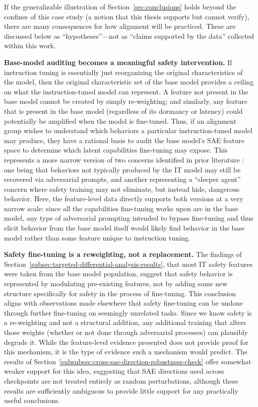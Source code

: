 If the generalizable illustration of Section~\ref{sec:conclusions} holds beyond the confines of this case study (a notion that this thesis supports but cannot verify), there are many consequences for how alignment will be practiced. These are discussed below as ``hypotheses''---not as ``claims supported by the data'' collected within this work.

\textbf{Base-model auditing becomes a meaningful safety intervention.} If instruction tuning is essentially just reorganizing the original characteristics of the model, then the original characteristic set of the base model provides a ceiling on what the instruction-tuned model can represent. A feature not present in the base model cannot be created by simply re-weighting; and similarly, any feature that is present in the base model (regardless of its dormancy or latency) could potentially be amplified when the model is fine-tuned. Thus, if an alignment group wishes to understand which behaviors a particular instruction-tuned model may produce, they have a rational basis to audit the base model's SAE feature space to determine which latent capabilities fine-tuning may expose. This represents a more narrow version of two concerns identified in prior literature \parencite{zou_universal_2023,hubinger_sleeper_2024}: one being that behaviors not typically produced by the IT model may still be recovered via adversarial prompts, and another representing a ``sleeper agent'' concern where safety training may not eliminate, but instead hide, dangerous behavior. Here, the feature-level data directly supports both versions at a very narrow scale: since all the capabilities fine-tuning works upon are in the base model, any type of adversarial prompting intended to bypass fine-tuning and thus elicit behavior from the base model itself would likely find behavior in the base model rather than some feature unique to instruction tuning.

\textbf{Safety fine-tuning is a reweighting, not a replacement.} The findings of Section~\ref{subsec:targeted-differential-analysis-results}, that most IT safety features were taken from the base model population, suggest that safety behavior is represented by modulating pre-existing features, not by adding some new structure specifically for safety in the process of fine-tuning. This conclusion aligns with observations made elsewhere \parencite{jain2024makesbreakssafetyfinetuning} that safety fine-tuning can be undone through further fine-tuning on seemingly unrelated tasks. Since we know safety is a re-weighting and not a structural addition, any additional training that alters those weights (whether or not done through adversarial processes) can plausibly degrade it. While the feature-level evidence presented does not provide proof for this mechanism, it is the type of evidence such a mechanism would predict. The results of Section~\ref{subsubsec:cross-sae-direction-robustness-check} offer somewhat weaker support for this idea, suggesting that SAE directions used across checkpoints are not treated entirely as random perturbations, although these results are sufficiently ambiguous to provide little support for any practically useful conclusions.

